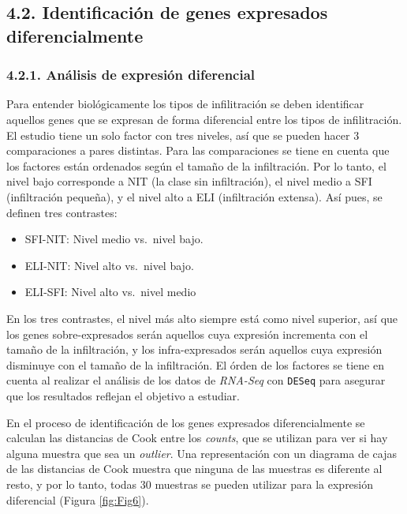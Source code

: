 \documentclass[
]{article}
\providecommand{\tightlist}{%
  \setlength{\itemsep}{0pt}\setlength{\parskip}{0pt}}
\begin{document}
\newpage

\hypertarget{identificaciuxf3n-de-genes-expresados-diferencialmente-1}{%
\subsection{4.2. Identificación de genes expresados
diferencialmente}\label{identificaciuxf3n-de-genes-expresados-diferencialmente-1}}

\hypertarget{anuxe1lisis-de-expresiuxf3n-diferencial-1}{%
\subsubsection{4.2.1. Análisis de expresión
diferencial}\label{anuxe1lisis-de-expresiuxf3n-diferencial-1}}

Para entender biológicamente los tipos de infilitración se deben
identificar aquellos genes que se expresan de forma diferencial entre
los tipos de infilitración. El estudio tiene un solo factor con tres
niveles, así que se pueden hacer 3 comparaciones a pares distintas. Para
las comparaciones se tiene en cuenta que los factores están ordenados
según el tamaño de la infiltración. Por lo tanto, el nivel bajo
corresponde a NIT (la clase sin infiltración), el nivel medio a SFI
(infiltración pequeña), y el nivel alto a ELI (infiltración extensa).
Así pues, se definen tres contrastes:

\begin{itemize}
\tightlist
\item
  SFI-NIT: Nivel medio vs.~nivel bajo.
\item
  ELI-NIT: Nivel alto vs.~nivel bajo.
\item
  ELI-SFI: Nivel alto vs.~nivel medio
\end{itemize}

En los tres contrastes, el nivel más alto siempre está como nivel
superior, así que los genes sobre-expresados serán aquellos cuya
expresión incrementa con el tamaño de la infiltración, y los
infra-expresados serán aquellos cuya expresión disminuye con el tamaño
de la infiltración. El órden de los factores se tiene en cuenta al
realizar el análisis de los datos de \emph{RNA-Seq} con \texttt{DESeq}
para asegurar que los resultados reflejan el objetivo a estudiar.

En el proceso de identificación de los genes expresados diferencialmente
se calculan las distancias de Cook entre los \emph{counts}, que se
utilizan para ver si hay alguna muestra que sea un \emph{outlier}. Una
representación con un diagrama de cajas de las distancias de Cook
muestra que ninguna de las muestras es diferente al resto, y por lo
tanto, todas 30 muestras se pueden utilizar para la expresión
diferencial (Figura \ref{fig:Fig6}).
\end{document}
